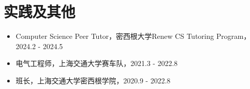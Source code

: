 \documentclass{resume}
\begin{document}
\section{实践及其他}
\begin{itemize}[parsep=0.2ex]
  \item Computer Science Peer Tutor，密西根大学Renew CS Tutoring Program， 2024.2 - 2024.5
  \item 电气工程师，上海交通大学赛车队，2021.3 - 2022.8
  \item 班长，上海交通大学密西根学院，2020.9 - 2022.8
\end{itemize}

%
%
\end{document}
